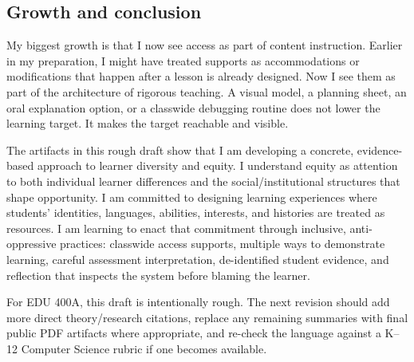 \documentclass[12pt]{article}
\begin{document}
\subsection{Growth and conclusion}

My biggest growth is that I now see access as part of content instruction. Earlier in my preparation, I might have treated supports as accommodations or modifications that happen after a lesson is already designed. Now I see them as part of the architecture of rigorous teaching. A visual model, a planning sheet, an oral explanation option, or a classwide debugging routine does not lower the learning target. It makes the target reachable and visible.

The artifacts in this rough draft show that I am developing a concrete, evidence-based approach to learner diversity and equity. I understand equity as attention to both individual learner differences and the social/institutional structures that shape opportunity. I am committed to designing learning experiences where students' identities, languages, abilities, interests, and histories are treated as resources. I am learning to enact that commitment through inclusive, anti-oppressive practices: classwide access supports, multiple ways to demonstrate learning, careful assessment interpretation, de-identified student evidence, and reflection that inspects the system before blaming the learner.

For EDU 400A, this draft is intentionally rough. The next revision should add more direct theory/research citations, replace any remaining summaries with final public PDF artifacts where appropriate, and re-check the language against a K--12 Computer Science rubric if one becomes available.
\end{document}
